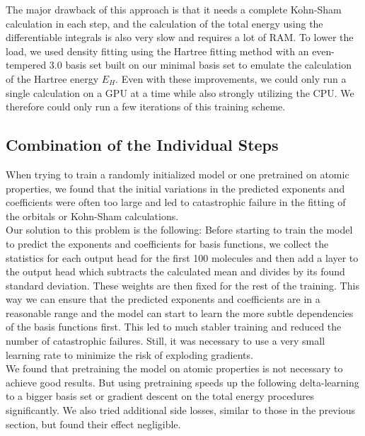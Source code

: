 The major drawback of this approach is that it needs a complete Kohn-Sham calculation in each step, and the calculation of the total energy using the differentiable integrals is also very slow and requires a lot of RAM. To lower the load, we used density fitting using the Hartree fitting method with an even-tempered 3.0 basis set built on our minimal basis set to emulate the calculation of the Hartree energy $E_H$. Even with these improvements, we could only run a single calculation on a GPU at a time while also strongly utilizing the CPU. We therefore could only run a few iterations of this training scheme.


\subsection{Combination of the Individual Steps}
When trying to train a randomly initialized model or one pretrained on atomic properties, we found that the initial variations in the predicted exponents and coefficients were often too large and led to catastrophic failure in the fitting of the orbitals or Kohn-Sham calculations.\\


Our solution to this problem is the following: Before starting to train the model to predict the exponents and coefficients for basis functions, we collect the statistics for each output head for the first 100 molecules and then add a layer to the output head which subtracts the calculated mean and divides by its found standard deviation. These weights are then fixed for the rest of the training. This way we can ensure that the predicted exponents and coefficients are in a reasonable range and the model can start to learn the more subtle dependencies of the basis functions first. This led to much stabler training and reduced the number of catastrophic failures. Still, it was necessary to use a very small learning rate to minimize the risk of exploding gradients.\\


We found that pretraining the model on atomic properties is not necessary to achieve good results. But using pretraining speeds up the following delta-learning to a bigger basis set or gradient descent on the total energy procedures significantly. We also tried additional side losses, similar to those in the previous section, but found their effect negligible.



